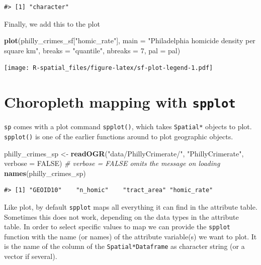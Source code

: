 \documentclass[]{book}
\newenvironment{Shaded}{\begin{snugshade}}{\end{snugshade}}
\newcommand{\KeywordTok}[1]{\textcolor[rgb]{0.13,0.29,0.53}{\textbf{#1}}}
\newcommand{\DataTypeTok}[1]{\textcolor[rgb]{0.13,0.29,0.53}{#1}}
\newcommand{\DecValTok}[1]{\textcolor[rgb]{0.00,0.00,0.81}{#1}}
\newcommand{\StringTok}[1]{\textcolor[rgb]{0.31,0.60,0.02}{#1}}
\newcommand{\CommentTok}[1]{\textcolor[rgb]{0.56,0.35,0.01}{\textit{#1}}}
\newcommand{\OtherTok}[1]{\textcolor[rgb]{0.56,0.35,0.01}{#1}}
\newcommand{\NormalTok}[1]{#1}
\begin{document}
\begin{verbatim}
#> [1] "character"
\end{verbatim}

Finally, we add this to the plot

\begin{Shaded}
\begin{Highlighting}[]
\KeywordTok{plot}\NormalTok{(philly_crimes_sf[}\StringTok{"homic_rate"}\NormalTok{], }
     \DataTypeTok{main =} \StringTok{"Philadelphia homicide density per square km"}\NormalTok{, }
     \DataTypeTok{breaks =} \StringTok{"quantile"}\NormalTok{, }\DataTypeTok{nbreaks =} \DecValTok{7}\NormalTok{,}
     \DataTypeTok{pal =}\NormalTok{ pal)}
\end{Highlighting}
\end{Shaded}

\texttt{[image: R-spatial\_files/figure-latex/sf-plot-legend-1.pdf]}

\section{\texorpdfstring{Choropleth mapping with
\texttt{spplot}}{Choropleth mapping with spplot}}\label{choropleth-mapping-with-spplot}

\texttt{sp} comes with a plot command \texttt{spplot()}, which takes
\texttt{Spatial*} objects to plot. \texttt{spplot()} is one of the
earlier functions around to plot geographic objects.

\begin{Shaded}
\begin{Highlighting}[]
\NormalTok{philly_crimes_sp <-}\StringTok{ }\KeywordTok{readOGR}\NormalTok{(}\StringTok{"data/PhillyCrimerate/"}\NormalTok{, }\StringTok{"PhillyCrimerate"}\NormalTok{, }\DataTypeTok{verbose =} \OtherTok{FALSE}\NormalTok{) }\CommentTok{# verbose = FALSE omits the message on loading}
\KeywordTok{names}\NormalTok{(philly_crimes_sp)}
\end{Highlighting}
\end{Shaded}

\begin{verbatim}
#> [1] "GEOID10"    "n_homic"    "tract_area" "homic_rate"
\end{verbatim}

Like plot, by default \texttt{spplot} maps all everything it can find in
the attribute table. Sometimes this does not work, depending on the data
types in the attribute table. In order to select specific values to map
we can provide the \texttt{spplot} function with the name (or names) of
the attribute variable(s) we want to plot. It is the name of the column
of the \texttt{Spatial*Dataframe} as character string (or a vector if
several).
\end{document}
